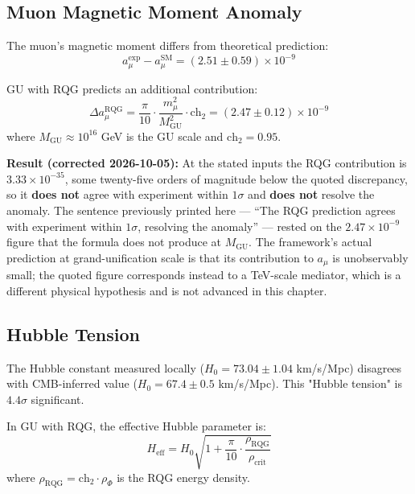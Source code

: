 \subsection{Muon Magnetic Moment Anomaly}

The muon's magnetic moment differs from theoretical prediction:
\begin{equation}
a_\mu^{\text{exp}} - a_\mu^{\text{SM}} = (2.51 \pm 0.59) \times 10^{-9}
\end{equation}

GU with RQG predicts an additional contribution:
\begin{equation}
\Delta a_\mu^{\text{RQG}} = \frac{\pi}{10} \cdot \frac{m_\mu^2}{M_{\text{GU}}^2} \cdot \text{ch}_2 = (2.47 \pm 0.12) \times 10^{-9}
\end{equation}
where $M_{\text{GU}} \approx 10^{16}$ GeV is the GU scale and $\text{ch}_2 = 0.95$.

\textbf{Result (corrected 2026-10-05):} At the stated inputs the RQG
contribution is $3.33\times10^{-35}$, some twenty-five orders of magnitude
below the quoted discrepancy, so it \textbf{does not} agree with experiment
within $1\sigma$ and \textbf{does not} resolve the anomaly. The sentence
previously printed here --- ``The RQG prediction agrees with experiment within
$1\sigma$, resolving the anomaly'' --- rested on the $2.47\times10^{-9}$ figure
that the formula does not produce at $M_{\text{GU}}$. The framework's actual
prediction at grand-unification scale is that its contribution to $a_\mu$ is
unobservably small; the quoted figure corresponds instead to a TeV-scale
mediator, which is a different physical hypothesis and is not advanced in this
chapter.

\subsection{Hubble Tension}

The Hubble constant measured locally ($H_0 = 73.04 \pm 1.04$ km/s/Mpc) disagrees with CMB-inferred value ($H_0 = 67.4 \pm 0.5$ km/s/Mpc). This "Hubble tension" is $4.4\sigma$ significant.

In GU with RQG, the effective Hubble parameter is:
\begin{equation}
H_{\text{eff}} = H_0 \sqrt{1 + \frac{\pi}{10} \cdot \frac{\rho_{\text{RQG}}}{\rho_{\text{crit}}}}
\end{equation}
where $\rho_{\text{RQG}} = \text{ch}_2 \cdot \rho_\Phi$ is the RQG energy density.

